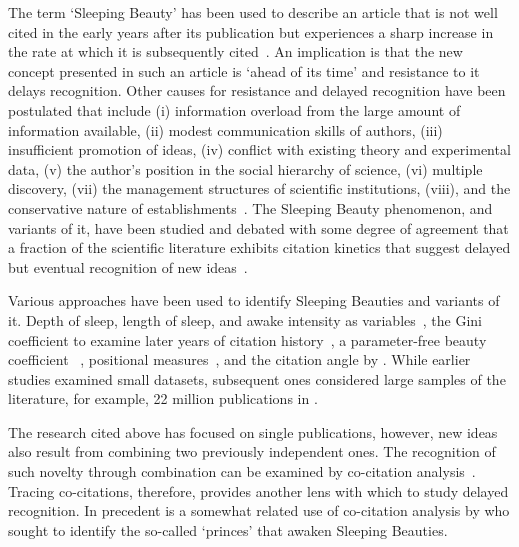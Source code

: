 \documentclass[utf8]{frontiersSCNS}
\begin{document}
The term `Sleeping Beauty' has been used to describe an article that is not well cited in the early years after its publication but experiences a sharp increase in the rate at which it is subsequently cited~\citep{Raan2004}. An implication is that the new concept presented in such an article is `ahead of its time' and resistance to it delays recognition. Other causes for resistance and delayed recognition have been postulated that include (i) information overload from the large amount of information available, (ii)  modest communication skills of authors, (iii) insufficient promotion of ideas, (iv) conflict with existing theory and experimental data, (v) the author's position in the social hierarchy of science, (vi)  multiple discovery, (vii) the management structures of scientific institutions, (viii), and the conservative nature of establishments~\citep{Barber1961,Merton1963,Cole1970,Garfield1970a,Garfield1980a}. The Sleeping Beauty phenomenon, and variants of it, have been studied and debated with some degree of agreement that a fraction of the scientific literature exhibits citation kinetics that suggest delayed but eventual recognition of new ideas~\citep{Glanzel2003,Glanzel2004,Raan2004,redner_2005,Braun_2010,Li2014,Ke2015,Li2016,Song2018,sugimoto_mostafa_2018,ye_bornmann_2018,Raan2019}. 

Various approaches have been used to identify Sleeping Beauties and variants of it. Depth of sleep, length of sleep, and awake intensity as variables~\citep{Raan2004}, the Gini coefficient to examine later years of citation history~\citep{li_2014}, a parameter-free beauty coefficient ~\citep{Ke2015}, positional measures~\citep{costas2010}, and the citation angle by \cite{ye_bornmann_2018}. While earlier studies examined small datasets, subsequent ones considered large samples of the literature, for example, 22 million publications in \cite{Ke2015}.
	
The research cited above has focused on single publications, however, new ideas also result from combining two previously independent ones. The recognition of such novelty through combination can be examined by co-citation analysis~\citep{MarshakovaShaikevich1973,Small1973,Uzzi2013,Boyack2014,Wang2017,Bradley2020}. Tracing co-citations, therefore, provides another lens with which to study delayed recognition.  In precedent is a somewhat related use of co-citation analysis by \cite{zong_2018,teixeira2017sleeping} who sought to identify the so-called `princes' that awaken Sleeping Beauties. 
\end{document}
